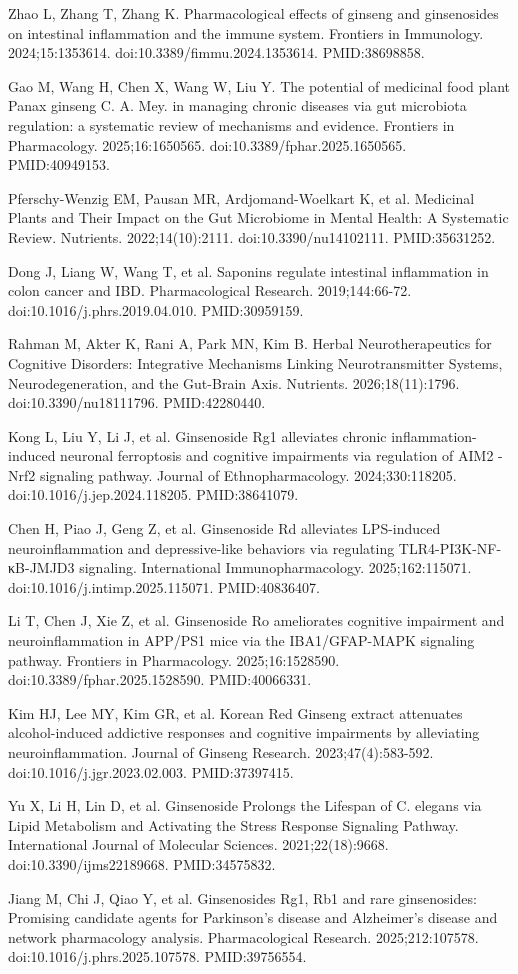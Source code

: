 \documentclass[11pt,oneside]{book}
\newcommand{\reff}[2]{\par\hangindent=7mm\hangafter=1\noindent[#1]\hspace{2mm}#2\par}
\begin{document}
\reff{24}{Zhao L, Zhang T, Zhang K. Pharmacological effects of ginseng and ginsenosides on intestinal inflammation and the immune system. Frontiers in Immunology. 2024;15:1353614. doi:10.3389/fimmu.2024.1353614. PMID:38698858.}
\reff{25}{Gao M, Wang H, Chen X, Wang W, Liu Y. The potential of medicinal food plant Panax ginseng C. A. Mey. in managing chronic diseases via gut microbiota regulation: a systematic review of mechanisms and evidence. Frontiers in Pharmacology. 2025;16:1650565. doi:10.3389/fphar.2025.1650565. PMID:40949153.}
\reff{26}{Pferschy-Wenzig EM, Pausan MR, Ardjomand-Woelkart K, et al. Medicinal Plants and Their Impact on the Gut Microbiome in Mental Health: A Systematic Review. Nutrients. 2022;14(10):2111. doi:10.3390/nu14102111. PMID:35631252.}
\reff{27}{Dong J, Liang W, Wang T, et al. Saponins regulate intestinal inflammation in colon cancer and IBD. Pharmacological Research. 2019;144:66-72. doi:10.1016/j.phrs.2019.04.010. PMID:30959159.}
\reff{28}{Rahman M, Akter K, Rani A, Park MN, Kim B. Herbal Neurotherapeutics for Cognitive Disorders: Integrative Mechanisms Linking Neurotransmitter Systems, Neurodegeneration, and the Gut-Brain Axis. Nutrients. 2026;18(11):1796. doi:10.3390/nu18111796. PMID:42280440.}
\reff{29}{Kong L, Liu Y, Li J, et al. Ginsenoside Rg1 alleviates chronic inflammation-induced neuronal ferroptosis and cognitive impairments via regulation of AIM2 - Nrf2 signaling pathway. Journal of Ethnopharmacology. 2024;330:118205. doi:10.1016/j.jep.2024.118205. PMID:38641079.}
\reff{30}{Chen H, Piao J, Geng Z, et al. Ginsenoside Rd alleviates LPS-induced neuroinflammation and depressive-like behaviors via regulating TLR4-PI3K-NF-κB-JMJD3 signaling. International Immunopharmacology. 2025;162:115071. doi:10.1016/j.intimp.2025.115071. PMID:40836407.}
\reff{31}{Li T, Chen J, Xie Z, et al. Ginsenoside Ro ameliorates cognitive impairment and neuroinflammation in APP/PS1 mice via the IBA1/GFAP-MAPK signaling pathway. Frontiers in Pharmacology. 2025;16:1528590. doi:10.3389/fphar.2025.1528590. PMID:40066331.}
\reff{32}{Kim HJ, Lee MY, Kim GR, et al. Korean Red Ginseng extract attenuates alcohol-induced addictive responses and cognitive impairments by alleviating neuroinflammation. Journal of Ginseng Research. 2023;47(4):583-592. doi:10.1016/j.jgr.2023.02.003. PMID:37397415.}
\reff{33}{Yu X, Li H, Lin D, et al. Ginsenoside Prolongs the Lifespan of C. elegans via Lipid Metabolism and Activating the Stress Response Signaling Pathway. International Journal of Molecular Sciences. 2021;22(18):9668. doi:10.3390/ijms22189668. PMID:34575832.}
\reff{34}{Jiang M, Chi J, Qiao Y, et al. Ginsenosides Rg1, Rb1 and rare ginsenosides: Promising candidate agents for Parkinson's disease and Alzheimer's disease and network pharmacology analysis. Pharmacological Research. 2025;212:107578. doi:10.1016/j.phrs.2025.107578. PMID:39756554.}
\end{document}

